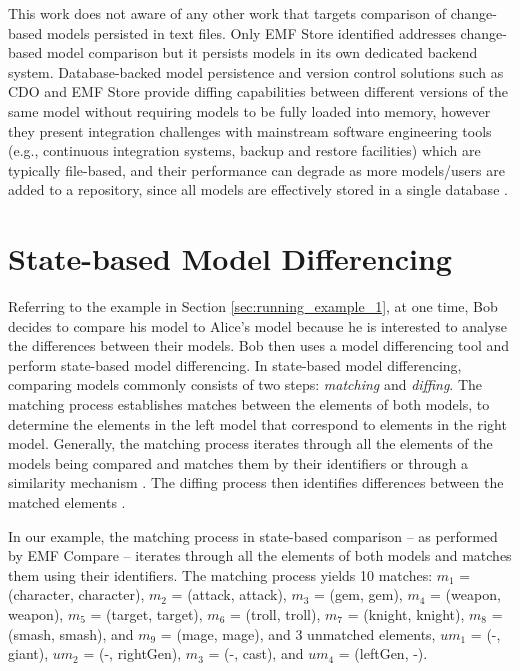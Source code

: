 This work does not aware of any other work that targets comparison of change-based models persisted in text files. Only EMF Store \cite{koegel2010emfstore} identified addresses change-based model comparison but it persists models in its own dedicated backend system. Database-backed model persistence and version control solutions such as CDO \cite{eclipse2019cdo} and EMF Store provide diffing capabilities between different versions of the same model without requiring models to be fully loaded into memory, however they present integration challenges with mainstream software engineering tools (e.g., continuous integration systems, backup and restore facilities) which are typically file-based, and their performance can degrade as more models/users are added to a repository, since all models are effectively stored in a single database \cite{KolovosRMPGCLRV13}. 

\section{State-based Model Differencing}
\label{sec:state-based_model_differencing}
Referring to the example in Section \ref{sec:running_example_1}, at one time, Bob decides to compare his model to Alice's model because he is interested to analyse the differences between their models. Bob then uses a model differencing tool and perform state-based model differencing. 
In state-based model differencing, comparing models commonly consists of two steps: \emph{matching} and \emph{diffing}.
The matching process establishes matches between the elements of both models, to determine the elements in the left model that correspond to elements in the right model. Generally, the matching process iterates through all the elements of the models being compared and matches them by their identifiers or through a similarity mechanism  \cite{DBLP:conf/sfm/BroschKLSWW12,emfcompare2018developer}. The diffing process then identifies differences between the matched elements \cite{DBLP:conf/sfm/BroschKLSWW12,emfcompare2018developer}. 

In our example, the matching process in state-based comparison -- as performed by EMF Compare \cite{emfcompare2018developer} -- iterates through all the elements of both models and matches them using their identifiers. The matching process yields 10 matches: $m_1$ = (\textsf{character}, \textsf{character}), $m_2$ = (\textsf{attack}, \textsf{attack}), $m_3$ = (\textsf{gem}, \textsf{gem}), $m_4$ = (\textsf{weapon}, \textsf{weapon}), $m_5$ = (\textsf{target}, \textsf{target}), $m_6$ = (\textsf{troll}, \textsf{troll}), $m_7$ = (\textsf{knight}, \textsf{knight}), $m_8$ = (\textsf{smash}, \textsf{smash}), and $m_9$ = (\textsf{mage}, \textsf{mage}), and 3 unmatched elements, $um_1$ = (-, \textsf{giant}), $um_2$ = (-, \textsf{rightGen}), $m_3$ = (-, \textsf{cast}), and $um_4$ = (\textsf{leftGen}, -). 

